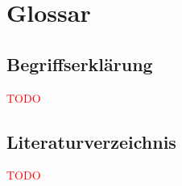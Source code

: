 \documentclass[]{subfiles}
\begin{document}
\section{Glossar}

\subsection*{Begriffserklärung}
    \textcolor{red}{TODO}

\clearpage
{}
\listoffigures*
\clearpage
\listoftables*

\newpage
\subsection*{Literaturverzeichnis}
    \textcolor{red}{TODO}
\end{document}
